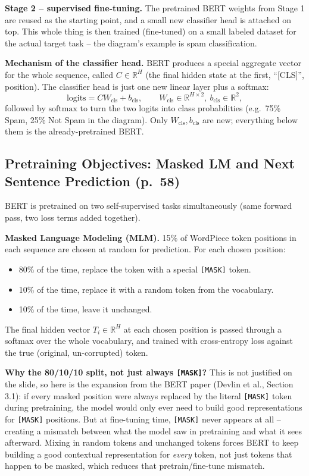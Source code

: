 \documentclass[11pt]{article}
\begin{document}
\textbf{Stage 2 -- supervised fine-tuning.} The pretrained BERT weights from Stage 1 are reused as the starting point, and a small new classifier head is attached on top. This whole thing is then trained (fine-tuned) on a small labeled dataset for the actual target task -- the diagram's example is spam classification.

\textbf{Mechanism of the classifier head.} BERT produces a special aggregate vector for the whole sequence, called $C \in \mathbb{R}^{H}$ (the final hidden state at the first, ``[CLS]'', position). The classifier head is just one new linear layer plus a softmax:
\[
\text{logits} = C W_{\text{cls}} + b_{\text{cls}}, \qquad W_{\text{cls}} \in \mathbb{R}^{H \times 2},\ b_{\text{cls}} \in \mathbb{R}^{2},
\]
followed by $\text{softmax}$ to turn the two logits into class probabilities (e.g.\ 75\% Spam, 25\% Not Spam in the diagram). Only $W_{\text{cls}}, b_{\text{cls}}$ are new; everything below them is the already-pretrained BERT.

\subsection{Pretraining Objectives: Masked LM and Next Sentence Prediction (p.\ 58)}

BERT is pretrained on two self-supervised tasks simultaneously (same forward pass, two loss terms added together).

\textbf{Masked Language Modeling (MLM).} 15\% of WordPiece token positions in each sequence are chosen at random for prediction. For each chosen position:
\begin{itemize}
\item 80\% of the time, replace the token with a special \texttt{[MASK]} token.
\item 10\% of the time, replace it with a random token from the vocabulary.
\item 10\% of the time, leave it unchanged.
\end{itemize}
The final hidden vector $T_i \in \mathbb{R}^H$ at each chosen position is passed through a softmax over the whole vocabulary, and trained with cross-entropy loss against the true (original, un-corrupted) token.

\textbf{Why the 80/10/10 split, not just always \texttt{[MASK]}?} This is not justified on the slide, so here is the expansion from the BERT paper (Devlin et al., Section 3.1): if every masked position were always replaced by the literal \texttt{[MASK]} token during pretraining, the model would only ever need to build good representations for \texttt{[MASK]} positions. But at fine-tuning time, \texttt{[MASK]} never appears at all -- creating a mismatch between what the model saw in pretraining and what it sees afterward. Mixing in random tokens and unchanged tokens forces BERT to keep building a good contextual representation for \emph{every} token, not just tokens that happen to be masked, which reduces that pretrain/fine-tune mismatch.
\end{document}
